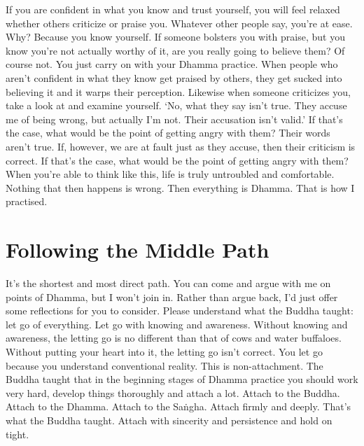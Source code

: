 If you are confident in what you know and trust yourself, you will feel relaxed whether others criticize or praise you. Whatever other people say, you're at ease. Why? Because you know yourself. If someone bolsters you with praise, but you know you're not actually worthy of it, are you really going to believe them? Of course not. You just carry on with your Dhamma practice. When people who aren't confident in what they know get praised by others, they get sucked into believing it and it warps their perception. Likewise when someone criticizes you, take a look at and examine yourself. `No, what they say isn't true. They accuse me of being wrong, but actually I'm not. Their accusation isn't valid.' If that's the case, what would be the point of getting angry with them? Their words aren't true. If, however, we are at fault just as they accuse, then their criticism is correct. If that's the case, what would be the point of getting angry with them? When you're able to think like this, life is truly untroubled and comfortable. Nothing that then happens is wrong. Then everything is Dhamma. That is how I practised.

\section*{Following the Middle Path}

It's the shortest and most direct path. You can come and argue with me on points of Dhamma, but I won't join in. Rather than argue back, I'd just offer some reflections for you to consider. Please understand what the Buddha taught: let go of everything. Let go with knowing and awareness. Without knowing and awareness, the letting go is no different than that of cows and water buffaloes. Without putting your heart into it, the letting go isn't correct. You let go because you understand conventional reality. This is non-attachment. The Buddha taught that in the beginning stages of Dhamma practice you should work very hard, develop things thoroughly and attach a lot. Attach to the Buddha. Attach to the Dhamma. Attach to the Sa\.ngha. Attach firmly and deeply. That's what the Buddha taught. Attach with sincerity and persistence and hold on tight.

